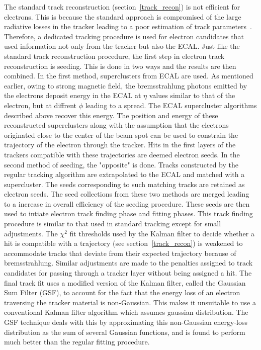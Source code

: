 The standard track reconstruction (section~\ref{track_recon}) is not efficient for electrons. This is because the standard approach is compromised of the large radiative losses in the tracker leading to a poor estimation of track parameters~\cite{track_reconstruction}. Therefore, a dedicated tracking procedure is used for  electron candidates that used information not only from the tracker but also the ECAL. Just like the standard track reconstruction procedure, the first step in electron track reconstruction is seeding. This is done in two ways and the results are then combined. In the first method, superclusters from ECAL are used. As mentioned earlier, owing to strong magnetic field, the bremsstrahlung photons emitted by the electrons deposit energy in the ECAL at $\eta$ values similar to that of the electron, but at diffrent $\phi$ leading to a spread. The ECAL supercluster algorithms described above recover this energy. The position and  energy of these reconstructed superclusters along with the assumption that the electrons originated close to the center of the beam spot can be used to constrain the trajectory of the electron through the tracker. Hits in the first layers of the trackers compatible with these trajectories are deemed electron seeds. In the second method of seeding, the "opposite" is done. Tracks constructed by the regular tracking algorithm are extrapolated to the ECAL and matched with a supercluster. The seeds corresponding to such matching tracks are retained as electron seeds. The seed collections from these two methods are merged leading to a increase in overall efficiency of the seeding procedure. These seeds are then used to intiate electron track finding phase and fitting phases. This track finding procedure is similar to that used in standard tracking except for small adjustments. The $\chi^2$ fit thresholds used by the Kalman filter to decide whether a hit is compatible with a trajectory (see section~\ref{track_recon}) is weakened to accommodate tracks that deviate from their expected trajectory because of bremsstrahlung. Similar adjustments are made to the penalties assigned to track candidates for passing through a tracker layer without being assigned a hit. The final track fit uses a modified version of the Kalman filter, called the Gaussian Sum Filter (GSF), to account for the fact that the energy loss of an electron traversing the tracker material is non-Gaussian. This  makes it unsuitable to use a conventional Kalman filter algorithm which assumes gaussian distribution. The GSF technique deals with this by approximating this non-Gaussian energy-loss distribution as the sum of several Gaussian functions, and is found to perform much better than the regular fitting procedure.

